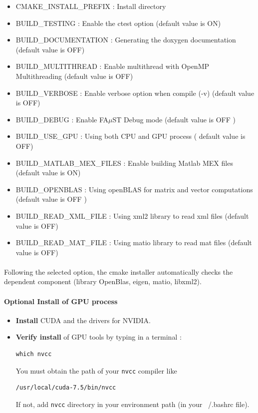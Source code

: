 \begin{itemize}
\item CMAKE\_INSTALL\_PREFIX : Install directory
\item BUILD\_TESTING : Enable the ctest option (default value is ON)
\item BUILD\_DOCUMENTATION : Generating the doxygen documentation (default value is OFF)  
\item BUILD\_MULTITHREAD : Enable multithread with OpenMP Multithreading (default value is OFF)
\item BUILD\_VERBOSE : Enable verbose option when compile (-v) (default value is OFF)
\item BUILD\_DEBUG : Enable FA$\mu$ST Debug mode (default value is OFF )
\item BUILD\_USE\_GPU : Using both CPU and GPU process ( default value is OFF)
\item BUILD\_MATLAB\_MEX\_FILES : Enable building Matlab MEX files (default value is ON)
\item BUILD\_OPENBLAS : Using openBLAS for matrix and vector computations (default value is OFF )
\item BUILD\_READ\_XML\_FILE : Using xml2 library to read xml files (default value is OFF)
\item BUILD\_READ\_MAT\_FILE : Using matio library to read mat files (default value is OFF)
\end{itemize}

\paragraph{}Following the selected option, the cmake installer automatically checks the dependent component (library OpenBlas, eigen, matio, libxml2).  

\paragraph{Optional Install of GPU process}
\begin{itemize}
\item \textbf{Install} CUDA and the drivers for NVIDIA.
\item \textbf{Verify install} of GPU tools by typing in a terminal : 
\begin{lstlisting}
which nvcc
\end{lstlisting}
You must obtain the path of your \texttt{nvcc} compiler like 
\begin{lstlisting}
/usr/local/cuda-7.5/bin/nvcc
\end{lstlisting}
If not, add \texttt{nvcc} directory in your environment path (in your ~/.bashrc file). 
\end{itemize}





